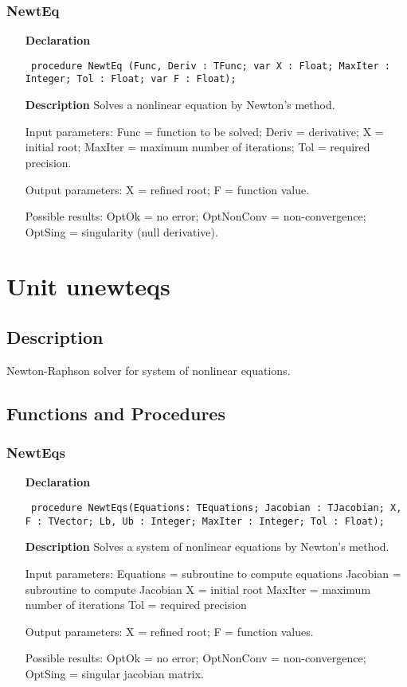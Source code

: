 \documentclass[12pt,a4paper,oneside]{report}
\newcommand{\declarationitem}[1]{\textbf{#1}}
\newcommand{\descriptiontitle}[1]{\textbf{#1}}
\newcommand{\code}[1]{\texttt{#1}}
\begin{document}
\subsubsection{NewtEq}
\label{unewteq-NewtEq}
\begin{itemize}\item[\declarationitem{Declaration}\hfill]
	\begin{flushleft}
		\code{
			procedure NewtEq (Func, Deriv : TFunc; var X : Float; MaxIter : Integer; Tol : Float; var F : Float);}
	\end{flushleft}
	\item[\descriptiontitle{Description}]
	Solves a nonlinear equation by Newton's method.
	
	Input parameters: Func = function to be solved; Deriv = derivative; X = initial root; MaxIter = maximum number of iterations; Tol = required precision.
	
	Output parameters: X = refined root; F = function value.
	
	Possible results: OptOk = no error; OptNonConv = non{-}convergence; OptSing = singularity (null derivative).
\end{itemize}
\section{Unit unewteqs}
\label{unewteqs}
\subsection{Description}
Newton{-}Raphson solver for system of nonlinear equations. \subsection{Functions and Procedures}
\subsubsection{NewtEqs}
\label{unewteqs-NewtEqs}
\begin{itemize}\item[\declarationitem{Declaration}\hfill]
	\begin{flushleft}
		\code{
			procedure NewtEqs(Equations: TEquations; Jacobian : TJacobian; X, F : TVector; Lb, Ub : Integer; MaxIter : Integer; Tol : Float);}
	\end{flushleft}
	\item[\descriptiontitle{Description}]
	Solves a system of nonlinear equations by Newton's method.
	
	Input parameters: Equations = subroutine to compute equations Jacobian = subroutine to compute Jacobian X = initial root MaxIter = maximum number of iterations Tol = required precision
	
	Output parameters: X = refined root; F = function values.
	
	Possible results: OptOk = no error; OptNonConv = non{-}convergence; OptSing = singular jacobian matrix.
	
\end{itemize}
\end{document}

